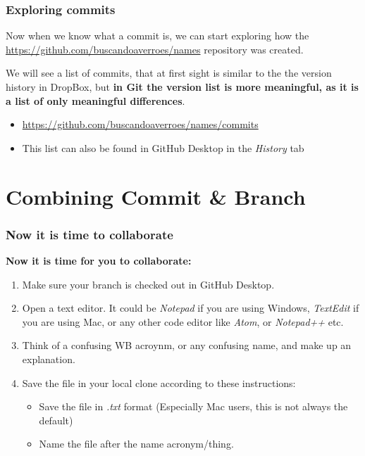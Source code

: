 \documentclass[aspectratio=169]{beamer} %
\newcommand{\trainingURL}[1]{{\color{blue}\url{#1}}}
\newcommand{\traininerUsername}{buscandoaverroes}
\newcommand{\repoName}{\traininerUsername/names}
\newcommand{\trainingRepoURL}[1]{\trainingURL{https://github.com/\repoName #1}}
\begin{document}
\begin{frame}
\frametitle{Exploring commits}

	Now when we know what a commit is, we can start exploring how the \trainingRepoURL{} repository was created.

	\vspace{.25cm}

	We will see a list of commits, that at first sight is similar to the the version history in DropBox, but \textbf{in Git the version list is more meaningful, as it is a list of only meaningful differences}.

	\vspace{.25cm}

	\begin{itemize}
		\item \trainingRepoURL{/commits}
		\item This list can also be found in GitHub Desktop in the \textit{History} tab
	\end{itemize}

\end{frame}


\section{Combining Commit \& Branch}

\begin{frame}
\frametitle{Now it is time to collaborate}

\textbf{Now it is time for you to collaborate:}
\begin{enumerate}
	\item Make sure your branch is checked out in GitHub Desktop.
	\item Open a text editor. It could be \textit{Notepad} if you are using Windows, \textit{TextEdit} if you are using Mac, or any other code editor like \textit{Atom}, or \textit{Notepad++} etc.
	\item Think of a confusing WB acroynm, or any confusing name, and make up an explanation.
	\item Save the file in your local clone according to these instructions:
	\begin{itemize}
		\item Save the file in \textit{.txt} format (Especially Mac users, this is not always the default)
		\item Name the file after the name acronym/thing.
	\end{itemize}
\end{enumerate}

\end{frame}
\end{document}
